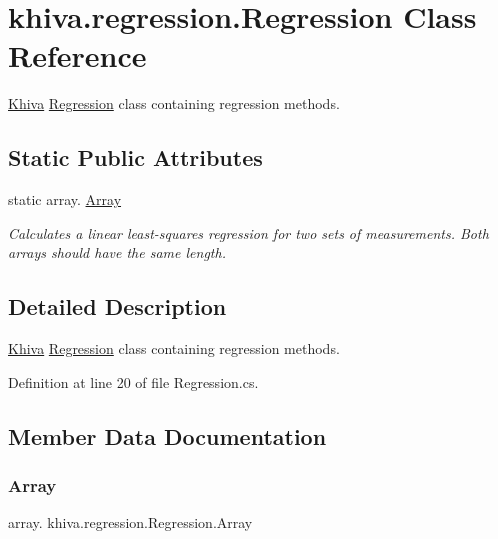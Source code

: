\hypertarget{classkhiva_1_1regression_1_1_regression}{}\section{khiva.\+regression.\+Regression Class Reference}
\label{classkhiva_1_1regression_1_1_regression}


\mbox{\hyperlink{classkhiva_1_1_khiva}{Khiva}} \mbox{\hyperlink{classkhiva_1_1regression_1_1_regression}{Regression}} class containing regression methods.  


\subsection*{Static Public Attributes}
\begin{DoxyCompactItemize}
\item 
static array. \mbox{\hyperlink{classkhiva_1_1regression_1_1_regression_a43cbb0d2e3ae7327c0b4be13a41fd22f}{Array}}
\begin{DoxyCompactList}\small\item\em Calculates a linear least-\/squares regression for two sets of measurements. Both arrays should have the same length. \end{DoxyCompactList}\end{DoxyCompactItemize}


\subsection{Detailed Description}
\mbox{\hyperlink{classkhiva_1_1_khiva}{Khiva}} \mbox{\hyperlink{classkhiva_1_1regression_1_1_regression}{Regression}} class containing regression methods. 



Definition at line 20 of file Regression.\+cs.



\subsection{Member Data Documentation}
\mbox{\label{classkhiva_1_1regression_1_1_regression_a43cbb0d2e3ae7327c0b4be13a41fd22f}} 
\subsubsection{\texorpdfstring{Array}{Array}}
{\footnotesize\ttfamily array. khiva.\+regression.\+Regression.\+Array\hspace{0.3cm}{\ttfamily [static]}}




